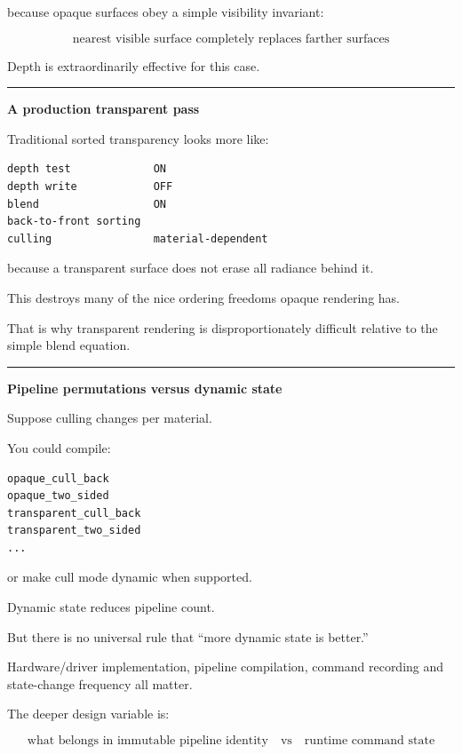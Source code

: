 because opaque surfaces obey a simple visibility invariant:

\[
\boxed{
\text{nearest visible surface completely replaces farther surfaces}
}
\]

Depth is extraordinarily effective for this case.

\begin{center}\rule{0.5\linewidth}{0.5pt}\end{center}

\textbf{A production transparent pass}

Traditional sorted transparency looks more like:

\begin{verbatim}
depth test             ON
depth write            OFF
blend                  ON
back-to-front sorting
culling                material-dependent
\end{verbatim}

because a transparent surface does not erase all radiance behind it.

This destroys many of the nice ordering freedoms opaque rendering has.

That is why transparent rendering is disproportionately difficult relative to the simple blend equation.

\begin{center}\rule{0.5\linewidth}{0.5pt}\end{center}

\textbf{Pipeline permutations versus dynamic state}

Suppose culling changes per material.

You could compile:

\begin{verbatim}
opaque_cull_back
opaque_two_sided
transparent_cull_back
transparent_two_sided
...
\end{verbatim}

or make cull mode dynamic when supported.

Dynamic state reduces pipeline count.

But there is no universal rule that ``more dynamic state is better.''

Hardware/driver implementation, pipeline compilation, command recording and state-change frequency all matter.

The deeper design variable is:

\[
\boxed{
\text{what belongs in immutable pipeline identity}
\quad\text{vs}\quad
\text{runtime command state}
}
\]

